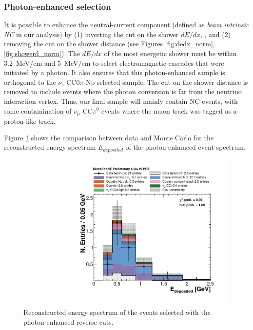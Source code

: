 \subsubsection{Photon-enhanced selection}
It is possible to enhance the neutral-current component (defined as \emph{beam intrinsic NC} in our analysis) by (1) inverting the cut on the shower $dE/dx$, , and (2) removing the cut on the shower distance (see Figures \ref{fig:dedx_norm}, \ref{fig:showerd_norm}). The $dE/dx$ of the most energetic shower must be within 3.2~MeV/cm and 5~MeV/cm to select electromagnetic cascades that were initiated by a photon. It also ensures that this photon-enhanced sample is orthogonal to the $\nu_{e}$ CC0$\pi$-Np selected sample. The cut on the shower distance is removed to include events where the photon conversion is far from the neutrino interaction vertex.
Thus, our final sample will mainly contain NC events, with some contamination of $\nu_{\mu}$ CC$\pi^{0}$ events where the muon track was tagged as a proton-like track.

Figure \ref{fig:photon} shows the comparison between data and Monte Carlo for the reconstructed energy spectrum $E_{deposited}$ of the photon-enhanced event spectrum. 

\begin{figure}[htbp]
\centering
  \includegraphics[width=0.7\linewidth]{figures/nc_reco.pdf}
  \caption{Reconstructed energy spectrum of the events selected with the photon-enhanced reverse cuts.}\label{fig:photon}
\end{figure}

